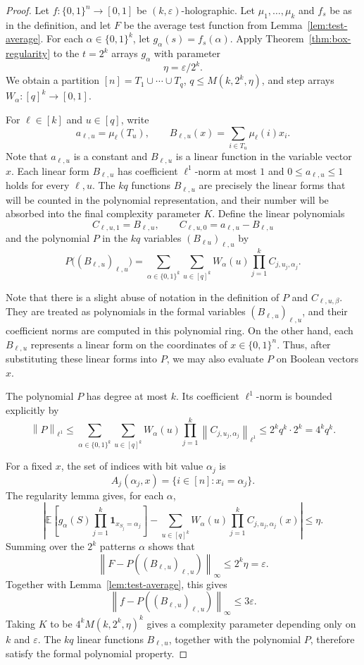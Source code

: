 \documentclass[11pt]{amsart}
\newcommand{\E}{\mathbb E}
\newcommand{\1}{\mathbf 1}
\newcommand{\cube}{\{0,1\}}
\newcommand{\norm}[1]{\left\lVert #1\right\rVert}
\begin{document}
\begin{proof}
Let $f:\{0,1\}^n\to [0,1]$ be $(k,\varepsilon)$-holographic.  Let $\mu_1,\ldots,\mu_k$ and $f_s$ be as in the definition, and let $F$ be the average test function from Lemma~\ref{lem:test-average}.  For each $\alpha\in\cube^k$, let $g_\alpha(s)=f_s(\alpha)$.  Apply Theorem~\ref{thm:box-regularity} to the $t=2^k$ arrays $g_\alpha$ with parameter
\[
        \eta=\varepsilon/2^k.
\]
We obtain a partition $[n]=T_1\cup\cdots\cup T_q$, $q\leq M(k,2^k,\eta)$, and step arrays $W_\alpha:[q]^k\to[0,1]$.

For $\ell\in[k]$ and $u\in[q]$, write
\[
        a_{\ell, u}=\mu_\ell(T_u),\qquad
        B_{\ell, u}(x)=\sum_{i\in T_u}\mu_\ell(i)x_i.
\]
Note that $a_{\ell, u}$ is a constant and $B_{\ell, u}$ is a linear function in the variable vector $x$. Each linear form $B_{\ell, u}$ has coefficient $\ell^1$-norm at most $1$ and $0\leq a_{\ell, u}\leq 1$ holds for every $\ell,u$. The $kq$ functions \(B_{\ell, u}\) are precisely the linear forms that will be counted in the polynomial representation, and their number will be absorbed into the final complexity parameter \(K\). Define the linear polynomials
\[
        C_{\ell,u,1}=B_{\ell, u},\qquad C_{\ell,u,0}=a_{\ell, u}-B_{\ell, u}
\]
and the polynomial $P$ in the $kq$ variables $(B_{\ell u})_{\ell,u}$ by
\[
        P\bigl((B_{\ell, u})_{\ell,u}\bigr)
        =\sum_{\alpha\in\cube^k}\sum_{u\in[q]^k} W_\alpha(u)
        \prod_{j=1}^k C_{j,u_j,\alpha_j}.
\]

Note that there is a slight abuse of notation in the definition of \(P\) and
\(C_{\ell,u,\beta}\).  They are treated as polynomials in the formal variables
\((B_{\ell,u})_{\ell,u}\), and their coefficient norms are computed in this
polynomial ring.  On the other hand, each \(B_{\ell,u}\) represents a linear
form on the coordinates of \(x\in\{0,1\}^n\).  Thus, after substituting these
linear forms into \(P\), we may also evaluate \(P\) on Boolean vectors \(x\).

The polynomial $P$ has degree at most $k$.  Its coefficient $\ell^1$-norm is bounded explicitly by
\[
        \norm{P}_{\ell^1}
        \leq
        \sum_{\alpha\in\cube^k}\sum_{u\in[q]^k} W_\alpha(u)
        \prod_{j=1}^k \norm{C_{j,u_j,\alpha_j}}_{\ell^1}
        \leq 2^k q^k\cdot 2^k
        =4^k q^k.
\]

For a fixed $x$, the set of indices with bit value $\alpha_j$ is
\[
        A_j(\alpha_j,x)=\{i\in[n]:x_i=\alpha_j\}.
\]
The regularity lemma gives, for each $\alpha$,
\[
\left|
\E\left[g_\alpha(S)\prod_{j=1}^k \1_{x_{S_j}=\alpha_j}\right]
-
\sum_{u\in[q]^k} W_\alpha(u)\prod_{j=1}^k C_{j,u_j,\alpha_j}(x)
\right|\leq\eta .
\]
Summing over the $2^k$ patterns $\alpha$ shows that
\[
        \norm{F-P((B_{\ell, u})_{\ell,u})}_{\infty}\leq 2^k\eta=\varepsilon .
\]
Together with Lemma~\ref{lem:test-average}, this gives
\[
        \norm{f-P((B_{\ell, u})_{\ell,u})}_{\infty}\leq3\varepsilon.
\]
Taking $K$ to be $4^k M(k,2^k,\eta)^k$ gives a complexity parameter depending only on $k$ and $\varepsilon$.  The $kq$ linear functions $B_{\ell, u}$, together with the polynomial $P$, therefore satisfy the formal polynomial property.
\end{proof}
\end{document}
